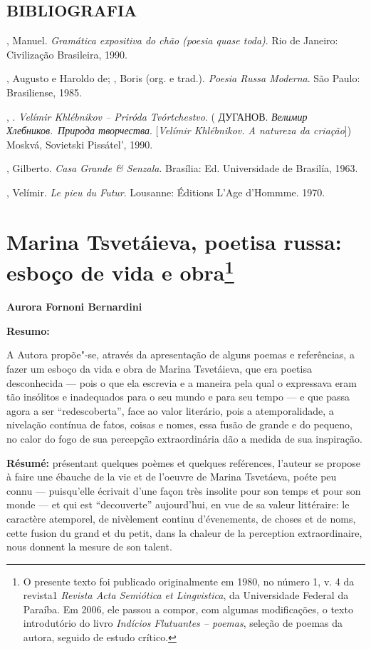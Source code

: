 \section{BIBLIOGRAFIA}

, Manuel. \emph{Gramática expositiva do chão (poesia quase toda)}.
Rio de Janeiro: Civilização Brasileira, 1990.

, Augusto e Haroldo de; , Boris (org. e trad.).
\emph{Poesia Russa Moderna}. São Paulo: Brasiliense, 1985.

, . \emph{Velímir Khlébnikov -- Priróda Tvórtchestvo}. (
ДУГАНОВ. \emph{Велимир Хлебников}.~\emph{Природа творчества}.
{[}\emph{Velímir Khlébnikov. A natureza da criação}{]}) Moskvá,
Sovietski Pissátel', 1990.

, Gilberto. \emph{Casa Grande \& Senzala}. Brasília: Ed.
Universidade de Brasilía, 1963.

, Velímir. \emph{Le pieu du Futur}. Lousanne: Éditions L'Age
d'Hommme. 1970.

\chapter{Marina Tsvetáieva, poetisa russa: esboço de vida e
obra\footnote{O presente texto foi publicado originalmente em 1980, no
  número 1, v. 4 da revista1 \emph{Revista Acta Semiótica et
  Lingvistica}, da Universidade Federal da Paraíba. Em 2006, ele passou
  a compor, com algumas modificações, o texto introdutório do livro
  \emph{Indícios Flutuantes -- poemas}, seleção de poemas da autora,
  seguido de estudo crítico.}}

\textbf{Aurora Fornoni Bernardini}

\textbf{Resumo: }

A Autora propõe"-se, através da apresentação de alguns poemas e
referências, a fazer um esboço da vida e obra de Marina Tsvetáieva, que
era poetisa desconhecida --- pois o que ela escrevia e a maneira pela
qual o expressava eram tão insólitos e inadequados para o seu mundo e
para seu tempo --- e que passa agora a ser ``redescoberta'', face ao
valor literário, pois a atemporalidade, a nivelação contínua de fatos,
coisas e nomes, essa fusão de grande e do pequeno, no calor do fogo de
sua percepção extraordinária dão a medida de sua inspiração.

\textbf{Résumé:} présentant quelques poèmes et quelques reférences,
l'auteur se propose à faire une ébauche de la vie et de l'oeuvre de
Marina Tsvetáeva, poéte peu connu --- puisqu'elle écrivait d'une façon
très insolite pour son temps et pour son monde --- et qui est
``decouverte'' aujourd'hui, en vue de sa valeur littéraire: le caractère
atemporel, de nivèlement continu d'évenements, de choses et de noms,
cette fusion du grand et du petit, dans la chaleur de la perception
extraordinaire, nous donnent la mesure de son talent.

